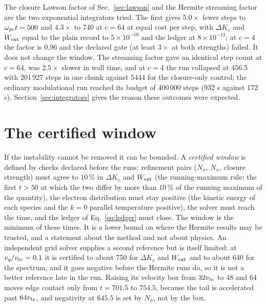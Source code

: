 The closure Lawson factor of Sec.~\ref{sec:lawson} and the Hermite streaming factor are the two exponential integrators tried. The first gives $5.0\times$ fewer steps to $\omega_{pe} t=500$ and $4.3\times$ to 740 at $c=64$ at equal cost per step, with $\Delta K_e$ and $W_{\rm ext}$ equal to the plain record to $5\times10^{-10}$ and the ledger at $8\times10^{-13}$; at $c=4$ the factor is $0.96$ and the declared gate (at least $3\times$ at both strengths) failed. It does not change the window. The streaming factor gave an identical step count at $c=64$, was $2.5\times$ slower in wall time, and at $c=4$ the run collapsed at 456.5 with 201\,927 steps in one chunk against 5444 for the closure-only control; the ordinary modulational run reached its budget of 400\,000 steps (932 s against 172 s). Section~\ref{sec:integrators} gives the reason these outcomes were expected.

\section{The certified window}\label{sec:windows}

If the instability cannot be removed it can be bounded. A \emph{certified window} is defined by checks declared before the runs: refinement pairs ($N_x$, $N_n$, closure strength) must agree to $10\,\%$ in $\Delta K_e$ and $W_{\rm ext}$ (the running-maximum rule: the first $t>50$ at which the two differ by more than $10\,\%$ of the running maximum of the quantity), the electron distribution must stay positive (the kinetic energy of each species and the $k=0$ parallel temperature positive), the solver must reach the time, and the ledger of Eq.~\eqref{eq:ledger} must close. The window is the minimum of these times. It is a lower bound on where the Hermite results may be trusted, and a statement about the method and not about physics. An independent grid solver supplies a second reference but is itself limited: at $v_q/v_{te}=0.1$ it is certified to about 750 for $\Delta K_e$ and $W_{\rm ext}$ and to about 640 for the spectrum, and it goes negative before the Hermite runs do, so it is not a better reference late in the run. Raising its velocity box from $32v_{te}$ to $48$ and $64$ moves edge contact only from $t=701.5$ to $754.5$, because the tail is accelerated past $64v_{te}$, and negativity at $645.5$ is set by $N_x$, not by the box.

